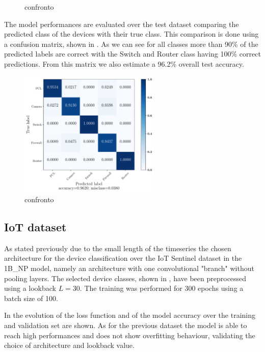 \begin{figure}[h]
\begin{minipage}[c]{0.49\linewidth}
{        \label{fig:4sics_loss}
        }
    \end{minipage}%
    \caption{confronto}
    \label{fig:4sics_results}
\end{figure}

The model performances are evaluated over the test dataset comparing the predicted class of the devices with their true class. This comparison is done using a confusion matrix, shown in . As we can see for all classes more than 90\% of the predicted labels are correct with the Switch and Router class having 100\% correct predictions. From this matrix we also estimate a 96.2\% overall test accuracy.

\begin{figure}[h]
    \centering
        \includegraphics[width=0.6\textwidth]{images/results/4SICS_clasf_20210613-174409__type_1branch__st_scale_sub__lb_100__act_elu__nf_16__ks_10__nn_50__l2_1e-05__bs_200__ep_300___cm.pdf}
    \caption{confronto}
    \label{fig:4sics_results_cm}
\end{figure}

\subsection{IoT dataset}

As stated previously due to the small length of the timeseries the chosen architecture for the device classification over the IoT Sentinel dataset in the 1B\_NP model, namely an architecture with one convolutional "branch" without pooling layers. The selected device classes, shown in , have been preprocessed using a lookback $L=30$. The training was performed for 300 epochs using a batch size of 100. 

In  the evolution of the loss function and of the model accuracy over the training and validation set are shown. As for the previous dataset the model is able to reach high performances and does not show overfitting behaviour, validating the choice of architecture and lookback value. 


